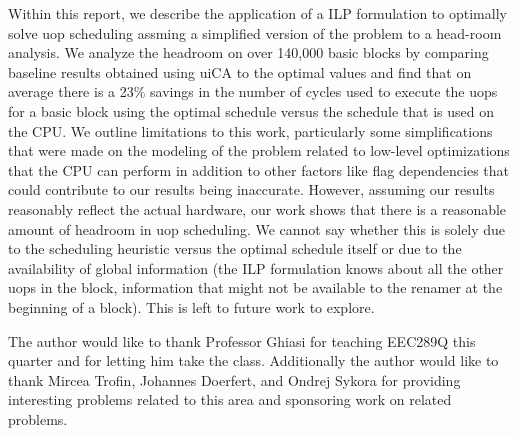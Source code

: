 \documentclass[sigconf]{acmart}
\begin{document}
Within this report, we describe the application of a ILP formulation to optimally solve uop scheduling assming a
simplified version of the problem to a head-room analysis. We analyze the headroom on over 140,000 basic blocks
by comparing baseline results obtained using uiCA to the optimal values and find that on average there is a 23\%
savings in the number of cycles used to execute the uops for a basic block using the optimal schedule versus the
schedule that is used on the CPU. We outline limitations to this work, particularly some simplifications that were
made on the modeling of the problem related to low-level optimizations that the CPU can perform in addition to
other factors like flag dependencies that could contribute to our results being inaccurate. However, assuming our
results reasonably reflect the actual hardware, our work shows that there is a reasonable amount of headroom in
uop scheduling. We cannot say whether this is solely due to the scheduling heuristic versus the optimal schedule
itself or due to the availability of global information (the ILP formulation knows about all the other uops in the
block, information that might not be available to the renamer at the beginning of a block). This is left to future
work to explore.

\begin{acks}
The author would like to thank Professor Ghiasi for teaching EEC289Q this quarter and for letting him take the
class. Additionally the author would like to thank Mircea Trofin, Johannes Doerfert, and Ondrej Sykora for providing
interesting problems related to this area and sponsoring work on related problems.
\end{acks}




\appendix
\end{document}
